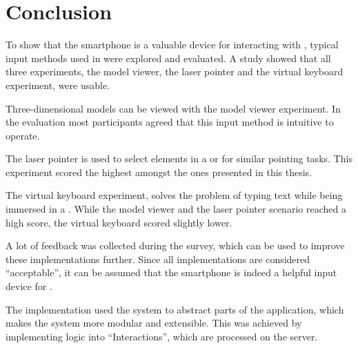 \chapter{Conclusion}\label{chapter:conclusion}

To show that the smartphone is a valuable device for interacting with , typical input methods used in  were explored and evaluated. A  study showed that all three experiments, the model viewer, the laser pointer and the virtual keyboard experiment, were usable. %

Three-dimensional models can be viewed with the model viewer experiment. In the evaluation most participants agreed that this input method is intuitive to operate.

The laser pointer is used to select elements in a  or for similar pointing tasks. This experiment scored the highest amongst the ones presented in this thesis. 

The virtual keyboard experiment, solves the problem of typing text while being immersed in a . While the model viewer and the laser pointer scenario reached a high score, the virtual keyboard scored slightly lower. 

A lot of feedback was collected during the survey, which can be used to improve these implementations further. Since all implementations are considered \enquote{acceptable}, it can be assumed that the smartphone is indeed a helpful input device for .

The implementation used the  system to abstract parts of the application, which makes the system more modular and extensible. This was achieved by implementing logic into \enquote{Interactions}, which are processed on the server. 